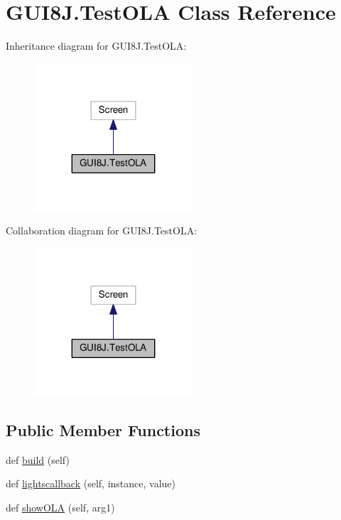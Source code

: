 \hypertarget{classGUI8J_1_1TestOLA}{}\section{G\+U\+I8\+J.\+Test\+O\+LA Class Reference}
\label{classGUI8J_1_1TestOLA}


Inheritance diagram for G\+U\+I8\+J.\+Test\+O\+LA\+:\nopagebreak
\begin{figure}[H]
\begin{center}
\leavevmode
\includegraphics[width=167pt]{classGUI8J_1_1TestOLA__inherit__graph}
\end{center}
\end{figure}


Collaboration diagram for G\+U\+I8\+J.\+Test\+O\+LA\+:\nopagebreak
\begin{figure}[H]
\begin{center}
\leavevmode
\includegraphics[width=167pt]{classGUI8J_1_1TestOLA__coll__graph}
\end{center}
\end{figure}
\subsection*{Public Member Functions}
\begin{DoxyCompactItemize}
\item 
def \hyperlink{classGUI8J_1_1TestOLA_a47fb9ef9e20bc4a64626590331057d60}{build} (self)
\item 
def \hyperlink{classGUI8J_1_1TestOLA_a12ec5bfda2ba9d420761f94685749f71}{lightscallback} (self, instance, value)
\item 
def \hyperlink{classGUI8J_1_1TestOLA_aee815c8adc3e28174c670bc78d2c3efe}{show\+O\+LA} (self, arg1)
\end{DoxyCompactItemize}
